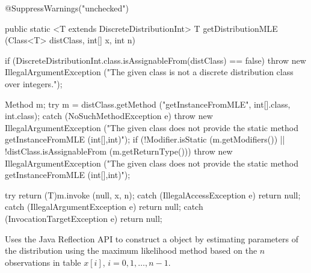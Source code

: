 \begin{htmlonly}
\end{htmlonly}
\begin{code}

\begin{hide} @SuppressWarnings("unchecked")
\end{hide}   public static <T extends DiscreteDistributionInt> T getDistributionMLE
                    (Class<T> distClass, int[] x, int n)\begin{hide} {
      if (DiscreteDistributionInt.class.isAssignableFrom(distClass) == false)
               throw new IllegalArgumentException 
                  ("The given class is not a discrete distribution class over integers.");
      
      Method m;
      try
      {
         m = distClass.getMethod ("getInstanceFromMLE", int[].class, int.class);
      }
      catch (NoSuchMethodException e) {
         throw new IllegalArgumentException
         ("The given class does not provide the static method getInstanceFromMLE (int[],int)");
      }
      if (!Modifier.isStatic (m.getModifiers()) ||
          !distClass.isAssignableFrom (m.getReturnType()))
         throw new IllegalArgumentException
         ("The given class does not provide the static method getInstanceFromMLE (int[],int)");
      
      try
      {
         return (T)m.invoke (null, x, n);
      }
      catch (IllegalAccessException e) {
         return null;
      }
      catch (IllegalArgumentException e) {
         return null;
      }
      catch (InvocationTargetException e) {
         return null;
      }      
   }\end{hide}
\end{code}
\begin{tabb}
   Uses the Java Reflection API to construct a 
   object by estimating parameters of the distribution using the maximum likelihood
   method based on the $n$ observations in table $x[i]$, $i = 0, 1, \ldots, n-1$.
\end{tabb}
\begin{htmlonly}
\end{htmlonly}
